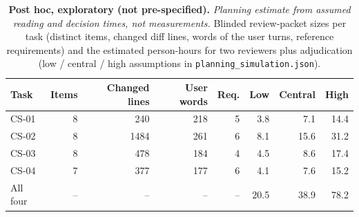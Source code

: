 \begin{table}[t]\centering\footnotesize
\caption{\textbf{Post hoc, exploratory (not pre-specified).} \emph{Planning estimate from assumed reading and decision times, not measurements.} Blinded review-packet sizes per task (distinct items, changed diff lines, words of the user turns, reference requirements) and the estimated person-hours for two reviewers plus adjudication (low / central / high assumptions in \texttt{planning\_simulation.json}).}\label{tab:plan-hours}
\begin{tabular}{lrrrrrrr}\toprule Task & Items & Changed lines & User words & Req. & Low & Central & High \\\midrule
CS-01 & 8 & 240 & 218 & 5 & 3.8 & 7.1 & 14.4 \\
CS-02 & 8 & 1484 & 261 & 6 & 8.1 & 15.6 & 31.2 \\
CS-03 & 8 & 478 & 184 & 4 & 4.5 & 8.6 & 17.4 \\
CS-04 & 7 & 377 & 177 & 6 & 4.1 & 7.6 & 15.2 \\
All four & -- & -- & -- & -- & 20.5 & 38.9 & 78.2 \\
\bottomrule\end{tabular}\end{table}
